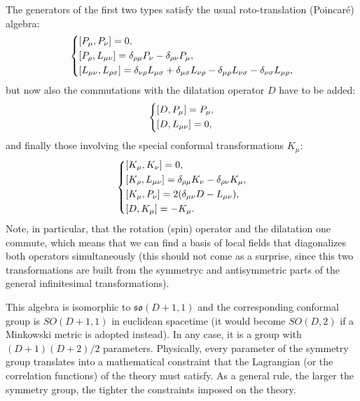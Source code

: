 The generators of the first two types satisfy the usual roto-translation (Poincar\'e) algebra:
\begin{equation}
    \begin{dcases}
        [P_{\mu},P_{\nu}]            =0,                                               \\
        [P_{\rho},L_{\mu\nu}]        =\delta_{\rho\mu}P_{\nu}-\delta_{\rho\nu}P_{\mu}, \\
        [L_{\mu\nu},L_{\rho\sigma}]  =\delta_{\nu\rho}L_{\mu\sigma}+\delta_{\mu\sigma}L_{\nu\rho}-\delta_{\mu\rho}L_{\nu\sigma}-\delta_{\nu\sigma}L_{\mu\rho},
    \end{dcases}
    \label{eq:conformal_algbra_poincare}
\end{equation}
but now also the commutations with the dilatation operator \(D\) have to be added:
\begin{equation}
    \begin{dcases}
        [D,P_{\mu}]     =P_{\mu}, \\
        [D,L_{\mu\nu}]  =0,
    \end{dcases}
    \label{eq:conformal_algbra_dilatation}
\end{equation}
and finally those involving the special conformal transformations \(K_{\mu}\):
\begin{equation}
    \begin{dcases}
        [K_{\mu},K_{\nu}]=0,                                                   \\
        [K_{\rho},L_{\mu\nu}]=\delta_{\rho\mu}K_{\nu}-\delta_{\rho\nu}K_{\mu}, \\
        [K_{\mu},P_{\nu}]=2(\delta_{\mu\nu}D-L_{\mu\nu}),                      \\
        [D,K_{\mu}]=-K_{\mu}.
    \end{dcases}
    \label{eq:conformal_algbra_special_conformal}
\end{equation}
Note, in particular, that the rotation (spin) operator and the dilatation one commute, which means that we can find a basis of local fields that diagonalizes both operators simultaneously (this should not come as a surprise, since this two transformations are built from the symmetryc and antisymmetric parts of the general infinitesimal transformations).

This algebra is isomorphic to \(\mathfrak{so}(D+1,1)\) and the corresponding conformal group is \(SO(D+1,1)\) in euclidean spacetime (it would become \(SO(D,2)\) if a Minkowski metric is adopted instead). In any case, it is a group with \((D+1)(D+2)/2\) parameters.
Physically, every parameter of the symmetry group translates into a mathematical constraint that the Lagrangian (or the correlation functions) of the theory must satisfy. As a general rule, the larger the symmetry group, the tighter the constraints imposed on the theory.

